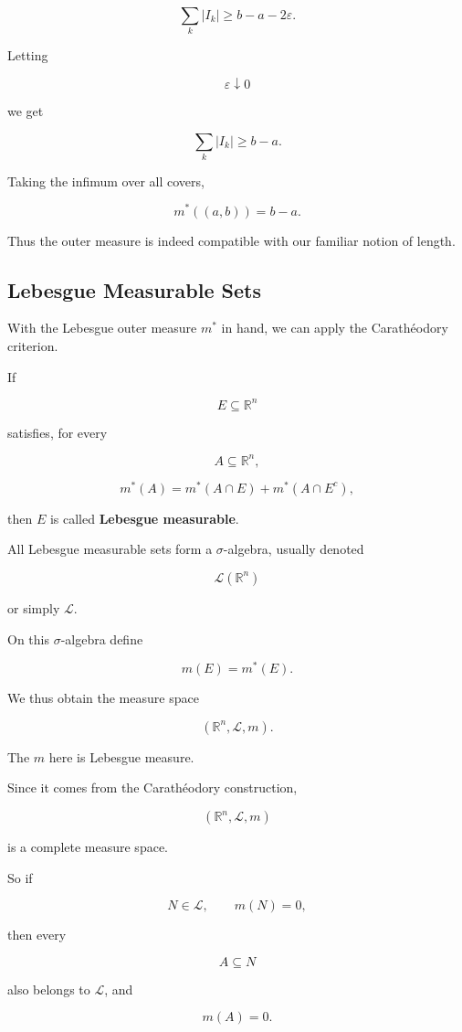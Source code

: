 \documentclass[11pt]{article}
\begin{document}
\[
\sum_{k}|I_{k}|\geq b-a-2\varepsilon.
\]

Letting

\[
\varepsilon\downarrow0
\]

we get

\[
\sum_{k}|I_{k}|\geq b-a.
\]

Taking the infimum over all covers,

\[
m^{*}((a,b))=b-a.
\]

Thus the outer measure is indeed compatible with our familiar notion of length.

\subsection{Lebesgue Measurable Sets}

With the Lebesgue outer measure $m^{*}$ in hand, we can apply the Carathéodory criterion.

If

\[
E\subseteq\mathbb{R}^{n}
\]

satisfies, for every

\[
A\subseteq\mathbb{R}^{n},
\]

\[
m^{*}(A)=m^{*}(A\cap E)+m^{*}(A\cap E^{c}),
\]

then $E$ is called \textbf{Lebesgue measurable}.

All Lebesgue measurable sets form a $\sigma$-algebra, usually denoted

\[
\mathcal{L}(\mathbb{R}^{n})
\]

or simply $\mathcal{L}$.

On this $\sigma$-algebra define

\[
m(E)=m^{*}(E).
\]

We thus obtain the measure space

\[
(\mathbb{R}^{n},\mathcal{L},m).
\]

The $m$ here is Lebesgue measure.

Since it comes from the Carathéodory construction,

\[
(\mathbb{R}^{n},\mathcal{L},m)
\]

is a complete measure space.

So if

\[
N\in\mathcal{L},\qquad m(N)=0,
\]

then every

\[
A\subseteq N
\]

also belongs to $\mathcal{L}$, and

\[
m(A)=0.
\]
\end{document}
